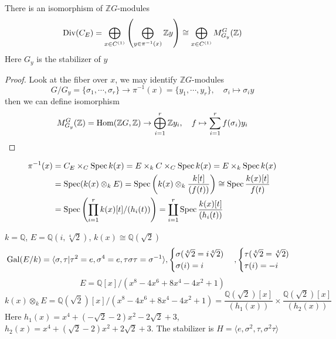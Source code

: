 \documentclass[a4paper,10pt]{article}
\begin{document}
\begin{lemma}
There is an isomorphism of $\mathbb ZG$-modules
\[
\operatorname{Div}(C_E)=\bigoplus_{x\in C^{(1)}}\left(\bigoplus_{y\in\pi^{-1}(x)}\mathbb Zy\right)\cong\bigoplus_{x\in C^{(1)}}M^G_{G_y}(\mathbb Z)
\]
Here $G_y$ is the stabilizer of $y$
\end{lemma}

\begin{proof}
Look at the fiber over $x$, we may identify $\mathbb ZG$-modules
\[G/G_y=\{\sigma_1,\cdots,\sigma_r\}\rightarrow \pi^{-1}(x)=\{y_1,\cdots,y_r\},\quad \sigma_i\mapsto\sigma_iy\]
 then we can define isomorphism
\begin{align}
M^G_{G_y}(\mathbb Z)=\operatorname{Hom}(\mathbb ZG,\mathbb Z)\to\bigoplus_{i=1}^r\mathbb Zy_i,\quad f\mapsto\sum_{i=1}^rf(\sigma_i)y_i
\end{align}
\end{proof}

\begin{example}
\begin{align*}
\pi^{-1}(x)&=C_E\times_C\operatorname{Spec} k(x)=E\times_kC\times_C\operatorname{Spec} k(x)=E\times_k\operatorname{Spec} k(x)\\
&=\operatorname{Spec}(k(x)\otimes_kE)=\operatorname{Spec}\left(k(x)\otimes_k\frac{k[t]}{(f(t))}\right)\cong\operatorname{Spec}\frac{k(x)[t]}{f(t)}\\
&=\operatorname{Spec}\left(\prod_{i=1}^rk(x)[t]/(h_i(t))\right)=\coprod_{i=1}^r\operatorname{Spec}\frac{k(x)[t]}{(h_i(t))}
\end{align*}
\end{example}

\begin{example}
$k=\mathbb Q$, $E=\mathbb Q(i,\sqrt[4]{2})$, $k(x)\cong\mathbb Q(\sqrt2)$
\[
\operatorname{Gal}(E/k)=\langle\sigma,\tau|\tau^2=e,\sigma^4=e,\tau\sigma\tau=\sigma^{-1}\rangle,\begin{cases}
\sigma(\sqrt[4]{2}=i\sqrt[4]{2})\\
\sigma(i)=i
\end{cases},\begin{cases}
\tau(\sqrt[4]{2}=\sqrt[4]{2})\\
\tau(i)=-i
\end{cases}
\]
\[
E=\mathbb Q[x]/(x^8-4x^6+8x^4-4x^2+1)
\]
\[
k(x)\otimes_kE=\mathbb Q(\sqrt2)[x]/(x^8-4x^6+8x^4-4x^2+1)=\frac{\mathbb Q(\sqrt2)[x]}{(h_1(x))}\times\frac{\mathbb Q(\sqrt2)[x]}{(h_2(x))}
\]
Here $h_1(x)=x^4+(-\sqrt2-2)x^2-2\sqrt2+3$, $h_2(x)=x^4+(\sqrt2-2)x^2+2\sqrt2+3$. The stabilizer is $H=\langle e,\sigma^2,\tau,\sigma^2\tau\rangle$
\end{example}
\end{document}
